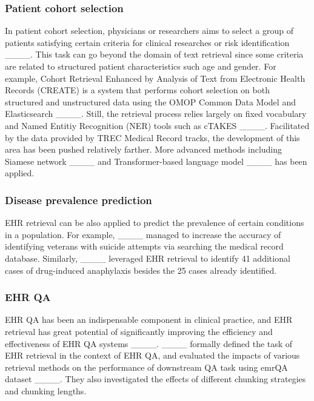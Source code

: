 \subsubsection{Patient cohort selection}
In patient cohort selection, physicians or researchers aims to select a group of patients satisfying certain criteria for clinical researches or risk identification ____.
This task can go beyond the domain of text retrieval since some criteria are related to structured patient characteristics such age and gender. 
For example, Cohort Retrieval Enhanced by Analysis of Text from Electronic Health Records (CREATE) is a system that performs cohort selection on both structured and unstructured data using the OMOP Common Data Model and Elasticsearch ____. 
Still, the retrieval process relies largely on fixed vocabulary and Named Entitiy Recognition (NER) tools such as cTAKES ____.
Facilitated by the data provided by TREC Medical Record tracks, the development of this area has been pushed relatively farther.
More advanced methods including Siamese network ____ and Transformer-based language model ____ has been applied.


\subsubsection{Disease prevalence prediction}
EHR retrieval can be also applied to predict the prevalence of certain conditions in a population.
For example, ____ managed to increase the accuracy of identifying veterans with suicide attempts via searching the medical record database. 
Similarly, ____ leveraged EHR retrieval to identify 41 additional cases of drug-induced anaphylaxis besides the 25 cases already identified. 

\subsubsection{EHR QA}
EHR QA has been an indispensable component in clinical practice, and EHR retrieval has great potential of significantly improving the efficiency and effectiveness of EHR QA systems ____.
____ formally defined the task of EHR retrieval in the context of EHR QA, and evaluated the impacts of various retrieval methods on the performance of downstream QA task using emrQA dataset ____.
They also investigated the effects of different chunking strategies and chunking lengths.

